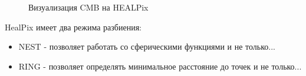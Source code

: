 \documentclass[14pt]{article} %
\begin{document}
\begin{figure}[h]
\begin{minipage}[h]{0.3\linewidth}
\end{minipage}
\hfill
\begin{minipage}[h]{0.69\linewidth}
\end{minipage}
\caption{Визуализация CMB на HEALPix}
\label{ris:image1}
\end{figure}


HealPix имеет два режима разбиения:
\begin{itemize}
\item NEST - позволяет работать со сферическими функциями и не только...

\item RING - позволяет определять минимальное расстояние до точек и не только...
\end{itemize}
\end{document}
